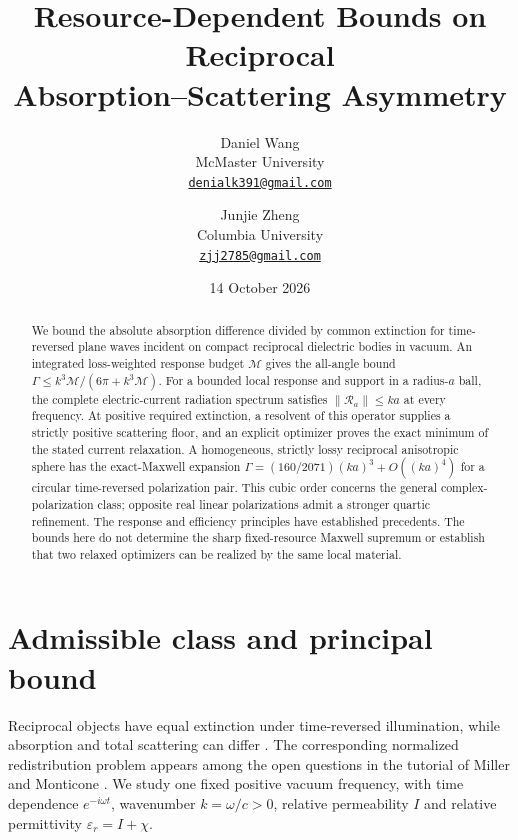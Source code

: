 \documentclass[11pt]{article}
\title{Resource-Dependent Bounds on Reciprocal\\Absorption--Scattering Asymmetry}
\author{Daniel Wang\\McMaster University\\\href{mailto:denialk391@gmail.com}{\texttt{denialk391@gmail.com}}
\and Junjie Zheng\\Columbia University\\\href{mailto:zjj2785@gmail.com}{\texttt{zjj2785@gmail.com}}}
\date{14 October 2026}
\newcommand{\norm}[1]{\lVert #1\rVert}
\begin{document}
\maketitle
\begin{abstract}
We bound the absolute absorption difference divided by common extinction for time-reversed plane waves incident on compact reciprocal dielectric bodies in vacuum. An integrated loss-weighted response budget $\mathcal M$ gives the all-angle bound $\Gamma\leq k^3\mathcal M/(6\pi+k^3\mathcal M)$. For a bounded local response and support in a radius-$a$ ball, the complete electric-current radiation spectrum satisfies $\norm{\mathcal R_a}\leq ka$ at every frequency. At positive required extinction, a resolvent of this operator supplies a strictly positive scattering floor, and an explicit optimizer proves the exact minimum of the stated current relaxation. A homogeneous, strictly lossy reciprocal anisotropic sphere has the exact-Maxwell expansion $\Gamma=(160/2071)(ka)^3+O((ka)^4)$ for a circular time-reversed polarization pair. This cubic order concerns the general complex-polarization class; opposite real linear polarizations admit a stronger quartic refinement. The response and efficiency principles have established precedents. The bounds here do not determine the sharp fixed-resource Maxwell supremum or establish that two relaxed optimizers can be realized by the same local material.
\end{abstract}

\section{Admissible class and principal bound}\label{sec:main}
Reciprocal objects have equal extinction under time-reversed illumination, while absorption and total scattering can differ \citep{SounasAlu2014,Hopkins2015,Hopkins2016}. The corresponding normalized redistribution problem appears among the open questions in the tutorial of Miller and Monticone \citep{MillerMonticone2026}. We study one fixed positive vacuum frequency, with time dependence $e^{-i\omega t}$, wavenumber $k=\omega/c>0$, relative permeability $I$ and relative permittivity $\varepsilon_r=I+\chi$.
\end{document}
